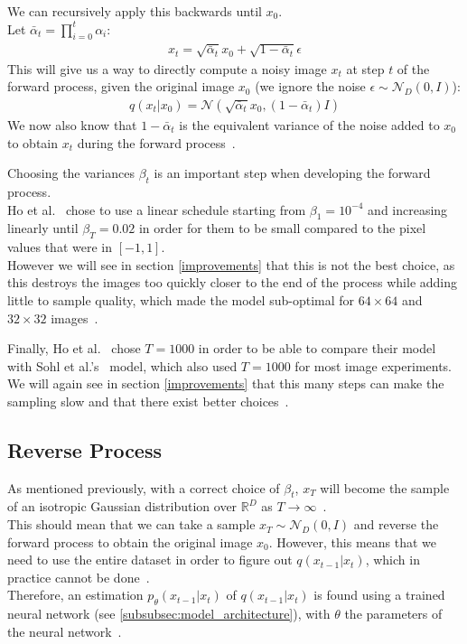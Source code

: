 \documentclass{article}
\numberwithin{equation}{section}
\numberwithin{figure}{section}
\begin{document}
We can recursively apply this backwards until $x_0$. \\
Let $\bar{\alpha}_t = \prod_{i=0}^{t}{\alpha_i}$:
\begin{align}
  x_t = \sqrt{\bar{\alpha}_t} x_0 + \sqrt{1 - \bar{\alpha}_t} \epsilon
\end{align}
This will give us a way to directly compute a noisy image $x_t$ at step $t$ of the forward process, given the original image $x_0$ (we ignore the noise $\epsilon \sim \mathcal{N}_D\left(0, I\right)$):
\begin{align}
  q\left(x_t | x_0\right) = \mathcal{N}\left(\sqrt{\bar{\alpha}_t} x_0, \left(1 - \bar{\alpha}_t\right)I\right) \label{eq:quickforwardprocess}
\end{align}
We now also know that $1 - \bar{\alpha}_t$ is the equivalent variance of the noise added to $x_0$ to obtain $x_t$ during the forward process~\cite{nichol2021improved}.

Choosing the variances $\beta_t$ is an important step when developing the forward process. \\
Ho et al.~\cite{ho2020denoising} chose to use a linear schedule starting from $\beta_1 = 10^{-4}$ and increasing linearly until $\beta_T = 0.02$ in order for them to be small compared to the pixel values that were in $\left[-1, 1\right]$. \\
However we will see in section \ref{improvements} that this is not the best choice, as this destroys the images too quickly closer to the end of the process while adding little to sample quality, which made the model sub-optimal for $64 \times 64$ and $32 \times 32$ images~\cite{nichol2021improved}.

Finally, Ho et al.~\cite{ho2020denoising} chose $T = 1000$ in order to be able to compare their model with Sohl et al.'s~\cite{sohldickstein2015deep} model, which also used $T = 1000$ for most image experiments. \\
We will again see in section \ref{improvements} that this many steps can make the sampling slow and that there exist better choices~\cite{nichol2021improved}.
\subsection{Reverse Process}
As mentioned previously, with a correct choice of $\beta_t$, $x_T$ will become the sample of an isotropic Gaussian distribution over $\mathbb{R}^D$ as $T \rightarrow \infty$~\cite{nichol2021improved, sohldickstein2015deep}. \\
This should mean that we can take a sample $x_T \sim \mathcal{N}_D \left(0, I\right)$ and reverse the forward process to obtain the original image $x_0$. 
However, this means that we need to use the entire dataset in order to figure out $q\left(x_{t-1} | x_t\right)$, which in practice cannot be done~\cite{nichol2021improved}. \\
Therefore, an estimation $p_\theta (x_{t-1} | x_t)$ of $q(x_{t-1}|x_t)$ is found using a trained neural network (see \ref{subsubsec:model_architecture}), with $\theta$ the parameters of the neural network~\cite{nichol2021improved}.
\end{document}
